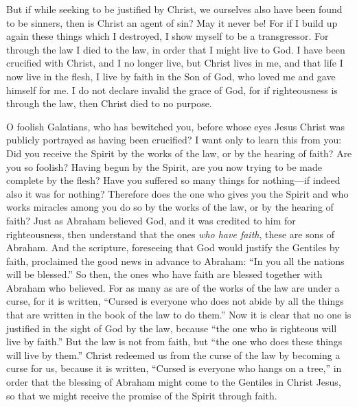 \begin{biblechapter}
\verse But if while seeking to be justified by Christ, we ourselves also have been found to be sinners, then is Christ an agent of sin? May it never be!
\verse For if I build up again these things which I destroyed, I show myself to be a transgressor.
\verse For through the law I died to the law, in order that I might live to God. I have been crucified with Christ,
\verse and I no longer live, but Christ lives in me, and that life I now live in the flesh, I live by faith in the Son of God, who loved me and gave himself for me.
\verse I do not declare invalid the grace of God, for if righteousness is through the law, then Christ died to no purpose.
\end{biblechapter}

\begin{biblechapter} %
 O foolish Galatians, who has bewitched you, before whose eyes Jesus Christ was publicly portrayed as having been crucified?
\verse I want only to learn this from you: Did you receive the Spirit by the works of the law, or by the hearing of faith?
\verse Are you so foolish? Having begun by the Spirit, are you now trying to be made complete by the flesh?
\verse Have you suffered so many things for nothing—if indeed also it was for nothing?
\verse Therefore does the one who gives you the Spirit and who works miracles among you do so by the works of the law, or by the hearing of faith?
\verse Just as Abraham believed God, and it was credited to him for righteousness,
\verse then understand that the ones \textit{who have faith}, these are sons of Abraham.
\verse And the scripture, foreseeing that God would justify the Gentiles by faith, proclaimed the good news in advance to Abraham: “In you all the nations will be blessed.”
\verse So then, the ones who have faith are blessed together with Abraham who believed.
\verse For as many as are of the works of the law are under a curse, for it is written, “Cursed is everyone who does not abide by all the things that are written in the book of the law to do them.”
\verse Now it is clear that no one is justified in the sight of God by the law, because “the one who is righteous will live by faith.”
\verse But the law is not from faith, but “the one who does these things will live by them.”
\verse Christ redeemed us from the curse of the law by becoming a curse for us, because it is written, “Cursed is everyone who hangs on a tree,”
\verse in order that the blessing of Abraham might come to the Gentiles in Christ Jesus, so that we might receive the promise of the Spirit through faith.

\end{biblechapter}
